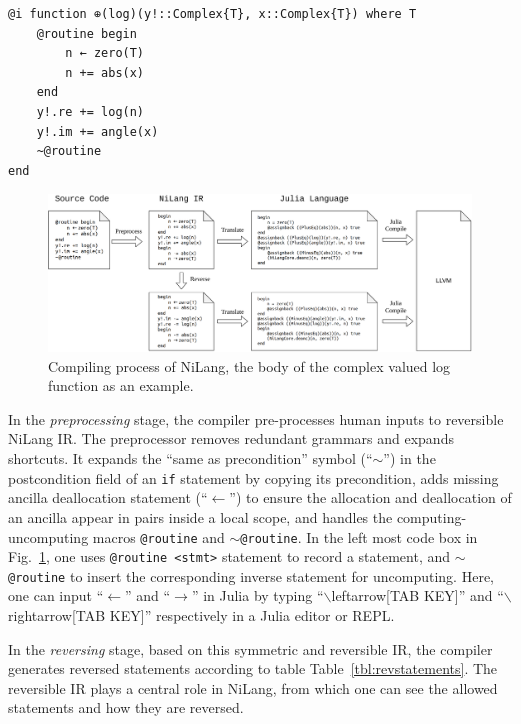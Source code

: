 \documentclass{article}
\newcommand{\<}{\langle}
\renewcommand{\>}{\rangle}
\newcommand{\Fig}[1]{Fig.~\ref{#1}}
\newcommand{\Tbl}[1]{Table~\ref{#1}}
\theoremstyle{definition}\newtheorem{definition}{\textit{Definition}}
\begin{document}
\begin{minipage}{.88\columnwidth}
\begin{lstlisting}[mathescape=true,caption={Reversible implementation of the complex valued log function.},label={lst:complex}]
@i function ⊕(log)(y!::Complex{T}, x::Complex{T}) where T
    @routine begin
        n ← zero(T)
        n += abs(x)
    end
    y!.re += log(n)
    y!.im += angle(x)
    ~@routine
end
\end{lstlisting}
\end{minipage}

\begin{figure}
    \centerline{\includegraphics[width=0.95\columnwidth,trim={0cm 0cm 0cm 0cm},clip]{compiling_v2.pdf}}
    \caption{Compiling process of NiLang, the body of the complex valued log function as an example.}\label{fig:compiling}
\end{figure}

In the \textit{preprocessing} stage, the compiler pre-processes human inputs to reversible NiLang IR.
The preprocessor removes redundant grammars and expands shortcuts. It expands the ``same as precondition'' symbol (``\texttt{$\sim$}'') in the postcondition field of an \texttt{if} statement by copying its precondition, adds missing ancilla deallocation statement (``$\leftarrow$'') to ensure the allocation and deallocation of an ancilla appear in pairs inside a local scope, and handles the computing-uncomputing macros \texttt{@routine} and \texttt{$\sim$@routine}.
In the left most code box in \Fig{fig:compiling}, one uses \texttt{@routine <stmt>} statement to record a statement, and \texttt{$\sim$@routine} to insert the corresponding inverse statement for uncomputing.
Here, one can input ``$\leftarrow$'' and ``$\rightarrow$'' in Julia by typing ``$\backslash$leftarrow[TAB KEY]'' and ``$\backslash$rightarrow[TAB KEY]'' respectively in a Julia editor or REPL.

In the \textit{reversing} stage, based on this symmetric and reversible IR, the compiler generates reversed statements according to table \Tbl{tbl:revstatements}.
The reversible IR plays a central role in NiLang, from which one can see the allowed statements and how they are reversed. 
\end{document}
